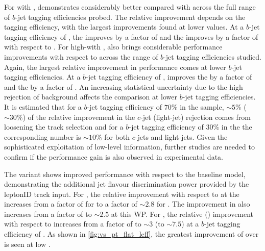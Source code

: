 For \ttbarjets with \ttbarpt, \GNN demonstrates considerably better \clrej compared with \DLr across the full range of $b$-jet tagging efficiencies probed.
The relative improvement depends on the \bjet tagging efficiency, with the largest improvements found at lower values.
At a $b$-jet tagging efficiency of \pct{\ttlo}, the \crej improves by a factor of \ttbclo and the \lrej improves by a factor of \ttbllo with respect to \DLr.
For high-\pt \Zprimejets with \Zprimept, \GNN also brings considerable performance improvements with respect to \DLr across the range of $b$-jet tagging efficiencies studied.
Again, the largest relative improvement in performance comes at lower $b$-jet tagging efficiencies.
At a $b$-jet tagging efficiency of \pct{\zplo}, \GNN improves the \crej by a factor of \zpbclo and the \lrej by a factor of \zpbllo.
An increasing statistical uncertainty due to the high rejection of background affects the comparison at lower $b$-jet tagging efficiencies.
It is estimated that for a $b$-jet tagging efficiency of $70\%$ in the \ttbar sample, $\sim5\%$ ($\sim30\%$) of the relative improvement in the $c$-jet (light-jet) rejection comes from loosening the track selection and for a $b$-jet tagging efficiency of $30\%$ in the \Zprime the corresponding number is $\sim10\%$ for both $c$-jets and light-jets.
Given the sophisticated exploitation of low-level information, further studies are needed to confirm if the performance gain is also observed in experimental data.

The \GNNLep variant shows improved performance with respect to the baseline \GNN model, demonstrating the additional jet flavour discrimination power provided by the leptonID track input.
For \ttbarjets, the relative \crej improvement with respect to \DLr at the \bWP{\ttlo} increases from a factor of \ttbclo for \GNN to a factor of $\sim 2.8$ for \GNNLep.
The improvement in \lrej also increases from a factor of \ttbllo to $\sim 2.5$ at this WP.
For \Zprimejets, the relative \crej (\lrej) improvement with respect to \DLr increases from a factor of \zpbclo to $\sim 3$ (\zpbllo to $\sim 7.5$) at a $b$-jet tagging efficiency of \pct{\zplo}.
As shown in \cref{fig:vs_pt_flat_leff}, the greatest improvement of \GNNLep over \GNN is seen at low \pt.

